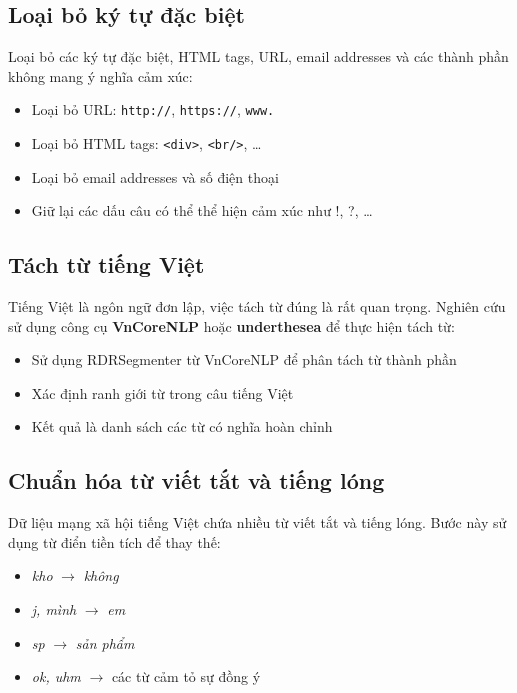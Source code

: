 \documentclass[14pt, a4paper]{report}
\begin{document}
\subsection{Loại bỏ ký tự đặc biệt}

Loại bỏ các ký tự đặc biệt, HTML tags, URL, email addresses và các thành phần không mang ý nghĩa cảm xúc:

\begin{itemize}
    \item Loại bỏ URL: \texttt{http://}, \texttt{https://}, \texttt{www.}
    \item Loại bỏ HTML tags: \texttt{<div>}, \texttt{<br/>}, \ldots
    \item Loại bỏ email addresses và số điện thoại
    \item Giữ lại các dấu câu có thể thể hiện cảm xúc như !, ?, \ldots
\end{itemize}

\subsection{Tách từ tiếng Việt}

Tiếng Việt là ngôn ngữ đơn lập, việc tách từ đúng là rất quan trọng. Nghiên cứu sử dụng công cụ \textbf{VnCoreNLP} hoặc \textbf{underthesea} để thực hiện tách từ:

\begin{itemize}
    \item Sử dụng RDRSegmenter từ VnCoreNLP để phân tách từ thành phần
    \item Xác định ranh giới từ trong câu tiếng Việt
    \item Kết quả là danh sách các từ có nghĩa hoàn chỉnh
\end{itemize}

\subsection{Chuẩn hóa từ viết tắt và tiếng lóng}

Dữ liệu mạng xã hội tiếng Việt chứa nhiều từ viết tắt và tiếng lóng. Bước này sử dụng từ điển tiền tích để thay thế:

\begin{itemize}
    \item \textit{kho} $\rightarrow$ \textit{không}
    \item \textit{j, mình} $\rightarrow$ \textit{em}
    \item \textit{sp} $\rightarrow$ \textit{sản phẩm}
    \item \textit{ok, uhm} $\rightarrow$ các từ cảm tỏ sự đồng ý
\end{itemize}
\end{document}
